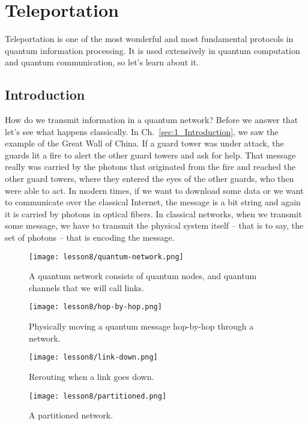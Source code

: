 \chapter{Teleportation}
\label{sec:8_teleportation}


Teleportation is one of the most wonderful and most fundamental protocols in quantum information processing. It is used extensively in quantum computation and quantum communication, so let's learn about it.

\section{Introduction}
\label{sec:8-1_introduction}


How do we transmit information in a quantum network? Before we answer that let's see what happens classically. In Ch.~\ref{sec:1_Introduction}, we saw the example of the Great Wall of China. If a guard tower was under attack, the guards lit a fire to alert the other guard towers and ask for help. That message really was carried by the photons that originated from the fire and reached the other guard towers, where they entered the eyes of the other guards, who then were able to act. In modern times, if we want to download some data or we want to communicate over the classical Internet, the message is a bit string and again it is carried by photons in optical fibers. In classical networks, when we transmit some message, we have to transmit the physical system itself  -- that is to say, the set of photons -- that is encoding the message.
\begin{figure}[H]
    \centering
    \texttt{[image: lesson8/quantum-network.png]}
        \caption[A quantum network of nodes and channels.]{A quantum network consists of quantum nodes, and quantum channels that we will call links.}
    \label{fig:quantum-network}
\end{figure}
\begin{figure}[H]
    \centering
    \texttt{[image: lesson8/hop-by-hop.png]}
        \caption[Hop-by-hop transmission.]{Physically moving a quantum message hop-by-hop through a network.}
    \label{fig:hop-by-hop}
\end{figure}
\begin{figure}[H]
    \centering
    \texttt{[image: lesson8/link-down.png]}
        \caption{Rerouting when a link goes down.}
    \label{fig:link-down}
\end{figure}
\begin{figure}[H]
    \centering
    \texttt{[image: lesson8/partitioned.png]}
        \caption{A partitioned network.}
    \label{fig:partition}
\end{figure}


